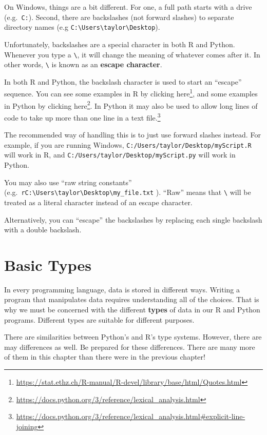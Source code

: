 \documentclass[
  12pt,
  krantz2]{krantz}
\renewcommand{\href}[2]{#2\footnote{\url{#1}}}
\begin{document}
On Windows, things are a bit different. For one, a full path starts with a drive (e.g.~\texttt{C:}). Second, there are backslashes (not forward slashes) to separate directory names (e.g \texttt{C:\textbackslash{}Users\textbackslash{}taylor\textbackslash{}Desktop}).

Unfortunately, backslashes are a special character in both R and Python. Whenever you type a \texttt{\textbackslash{}}, it will change the meaning of whatever comes after it. In other words, \texttt{\textbackslash{}} is known as an \textbf{escape character}.

In both R and Python, the backslash character is used to start an ``escape'' sequence. You can see some examples in R by clicking \href{https://stat.ethz.ch/R-manual/R-devel/library/base/html/Quotes.html}{here}, and some examples in Python by clicking \href{https://docs.python.org/3/reference/lexical_analysis.html}{here}. In Python it may also be used to \href{https://docs.python.org/3/reference/lexical_analysis.html\#explicit-line-joining}{allow long lines of code to take up more than one line in a text file.}

The recommended way of handling this is to just use forward slashes instead. For example, if you are running Windows, \texttt{C:/Users/taylor/Desktop/myScript.R} will work in R, and \texttt{C:/Users/taylor/Desktop/myScript.py} will work in Python.

You may also use ``raw string constants'' (e.g.~\texttt{r\textquotesingle{}C:\textbackslash{}Users\textbackslash{}taylor\textbackslash{}Desktop\textbackslash{}my\_file.txt\textquotesingle{}} ). ``Raw'' means that \texttt{\textbackslash{}} will be treated as a literal character instead of an escape character.

Alternatively, you can ``escape'' the backslashes by replacing each single backslash with a double backslash.

\hypertarget{basic-types}{%
\chapter{Basic Types}\label{basic-types}}

In every programming language, data is stored in different ways. Writing a program that manipulates data requires understanding all of the choices. That is why we must be concerned with the different \textbf{types} of data in our R and Python programs. Different types are suitable for different purposes.

There are similarities between Python's and R's type systems. However, there are may differences as well. Be prepared for these differences. There are many more of them in this chapter than there were in the previous chapter!
\end{document}
